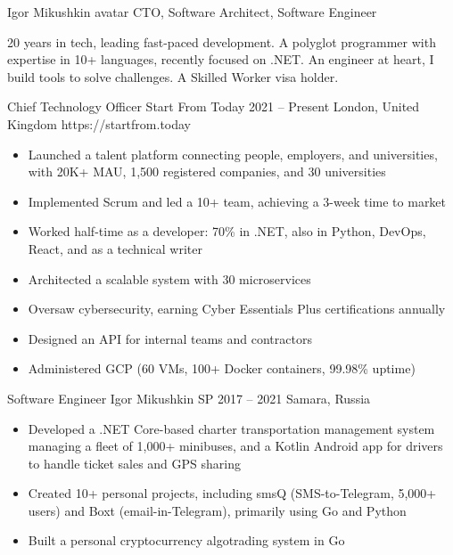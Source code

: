 \documentclass[9pt,a4paper]{juicv}
\begin{document}
\begin{paracol}{2}
\cvMakeHeader
    {Igor Mikushkin}
    {avatar}
    {CTO, Software Architect, Software Engineer}

    20 years in tech, leading fast-paced development.
    A polyglot programmer with expertise in 10+ languages, recently focused on .NET.
    An engineer at heart, I build tools to solve challenges.
    A Skilled Worker visa holder.

    \cvLeftEvent
        {Chief Technology Officer}
        {Start From Today}
        {2021 -- Present}
        {London, United Kingdom}
        {https://startfrom.today}

        \begin{itemize}
            \item Launched a talent platform connecting people, employers, and universities,
                  with 20K+ MAU, 1,500 registered companies, and 30 universities
            \item Implemented Scrum and led a 10+ team,
                  achieving a 3-week time to market
            \item Worked half-time as a developer: 70\% in .NET,
                  also in Python, DevOps, React, and as a technical writer
            \item Architected a scalable system with 30 microservices
            \item Oversaw cybersecurity, earning Cyber Essentials Plus certifications annually
            \item Designed an API for internal teams and contractors
            \item Administered GCP (60 VMs, 100+ Docker containers, 99.98\% uptime)
        \end{itemize}

    \cvLeftEvent
        {Software Engineer}
        {Igor Mikushkin SP}
        {2017 -- 2021}
        {Samara, Russia}
        {}

        \begin{itemize}
            \item Developed a .NET Core-based charter transportation management system
                  managing a fleet of 1,000+ minibuses,
                  and a Kotlin Android app for drivers to handle ticket sales and GPS sharing
            \item Created 10+ personal projects,
                  including smsQ (SMS-to-Telegram, 5,000+ users)
                  and Boxt (email-in-Telegram), primarily using Go and Python
            \item Built a personal cryptocurrency algotrading system in Go
        \end{itemize}


\end{paracol}
\end{document}
